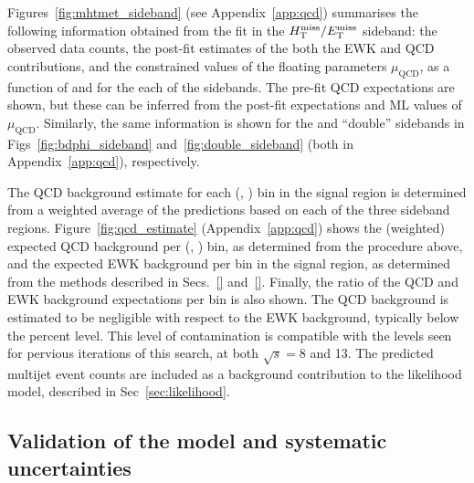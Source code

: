 Figures~\ref{fig:mhtmet_sideband} (see Appendix~\ref{app:qcd})
summarises the following information obtained from the fit in the
$\mbox{$\mbox{$H_{\rm T}^{\rm miss}$} / \mbox{$E_\text{T}^{\rm miss}$}$}$ sideband: the observed data counts, the post-fit estimates
of the both the EWK and QCD contributions, and the constrained values
of the floating parameters $\mu_{\textrm{QCD}}$, as a function of
\njet and \scalht for the each of the sidebands. The pre-fit QCD
expectations are shown, but these can be inferred from the post-fit
expectations and ML values of $\mu_{\textrm{QCD}}$. Similarly, the
same information is shown for the \bdphi and ``double'' sidebands in
Figs~\ref{fig:bdphi_sideband} and~\ref{fig:double_sideband} (both in
Appendix~\ref{app:qcd}), respectively.

The QCD background estimate for each (\njet, \scalht) bin in the
signal region is determined from a weighted average of the predictions
based on each of the three sideband regions. 
Figure~\ref{fig:qcd_estimate} (Appendix~\ref{app:qcd}) shows the
(weighted) expected QCD background per (\njet, \scalht) bin, as
determined from the procedure above, and the expected EWK background
per bin in the signal region, as determined from the methods described
in Secs.~\ref{} and~\ref{}. Finally, the ratio of the QCD and EWK
background expectations per bin is also shown. The QCD background is
estimated to be negligible with respect to the EWK background,
typically below the percent level. This level of contamination is
compatible with the levels seen for pervious iterations of this
search, at both $\sqrt{s} = 8$ and 13\TeV. The predicted multijet
event counts are included as a background contribution to the
likelihood model, described in Sec~\ref{sec:likelihood}.

\subsection{Validation of the model and systematic uncertainties}
\label{sec:qcdValidation}

